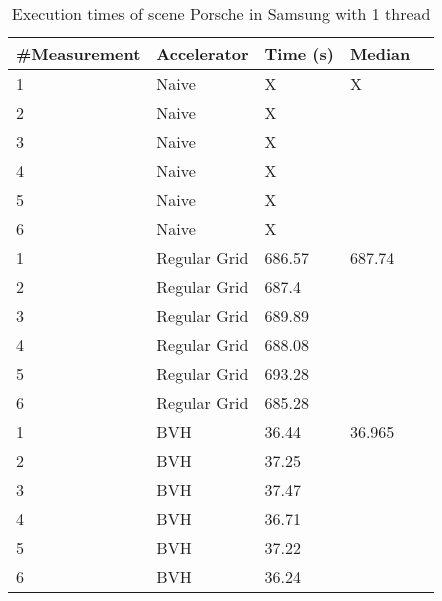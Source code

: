 \begin{table}[H]
	\small
	\begin{tabular}{|l|l|l|l|l|}
		\hline
		\#Measurement & Accelerator & Time (s) & Median \\ \hline
		1 & Naive & X & X \\ \hline
		2 & Naive & X & \\ \hline
		3 & Naive & X & \\ \hline
		4 & Naive & X & \\ \hline
		5 & Naive & X & \\ \hline
		6 & Naive & X & \\ \hline
		1 & Regular Grid & 686.57 & 687.74 \\ \hline
		2 & Regular Grid & 687.4 & \\ \hline
		3 & Regular Grid & 689.89 & \\ \hline
		4 & Regular Grid & 688.08 & \\ \hline
		5 & Regular Grid & 693.28 & \\ \hline
		6 & Regular Grid & 685.28 & \\ \hline
		1 & BVH & 36.44 & 36.965 \\ \hline
		2 & BVH & 37.25 & \\ \hline
		3 & BVH & 37.47 & \\ \hline
		4 & BVH & 36.71 & \\ \hline
		5 & BVH & 37.22 & \\ \hline
		6 & BVH & 36.24 & \\ \hline
	\end{tabular}
	\label{Time}
	\caption{Execution times of scene Porsche in Samsung with 1 thread}
\end{table}

